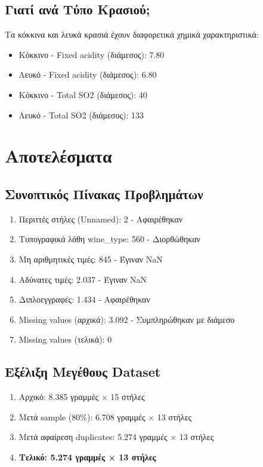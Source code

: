 \documentclass[12pt,a4paper]{article}
\begin{document}
\subsection{\textgreek{Γιατί ανά Τύπο Κρασιού;}}

\textgreek{Τα κόκκινα και λευκά κρασιά έχουν διαφορετικά χημικά χαρακτηριστικά:}

\begin{itemize}
    \item \textgreek{Κόκκινο - Fixed acidity (διάμεσος): 7.80}
    \item \textgreek{Λευκό - Fixed acidity (διάμεσος): 6.80}
    \item \textgreek{Κόκκινο - Total SO2 (διάμεσος): 40}
    \item \textgreek{Λευκό - Total SO2 (διάμεσος): 133}
\end{itemize}

\section{\textgreek{Αποτελέσματα}}

\subsection{\textgreek{Συνοπτικός Πίνακας Προβλημάτων}}

\begin{enumerate}
    \item \textgreek{Περιττές στήλες (Unnamed): 2 - Αφαιρέθηκαν}
    \item \textgreek{Τυπογραφικά λάθη wine\_type: 560 - Διορθώθηκαν}
    \item \textgreek{Μη αριθμητικές τιμές: 845 - Έγιναν NaN}
    \item \textgreek{Αδύνατες τιμές: 2.037 - Έγιναν NaN}
    \item \textgreek{Διπλοεγγραφές: 1.434 - Αφαιρέθηκαν}
    \item \textgreek{Missing values (αρχικά): 3.092 - Συμπληρώθηκαν με διάμεσο}
    \item \textgreek{Missing values (τελικά): 0}
\end{enumerate}

\subsection{\textgreek{Εξέλιξη Μεγέθους Dataset}}

\begin{enumerate}
    \item \textgreek{Αρχικό: 8.385 γραμμές × 15 στήλες}
    \item \textgreek{Μετά sample (80\%): 6.708 γραμμές × 13 στήλες}
    \item \textgreek{Μετά αφαίρεση duplicates: 5.274 γραμμές × 13 στήλες}
    \item \textbf{\textgreek{Τελικό: 5.274 γραμμές × 13 στήλες}}
\end{enumerate}
\end{document}
